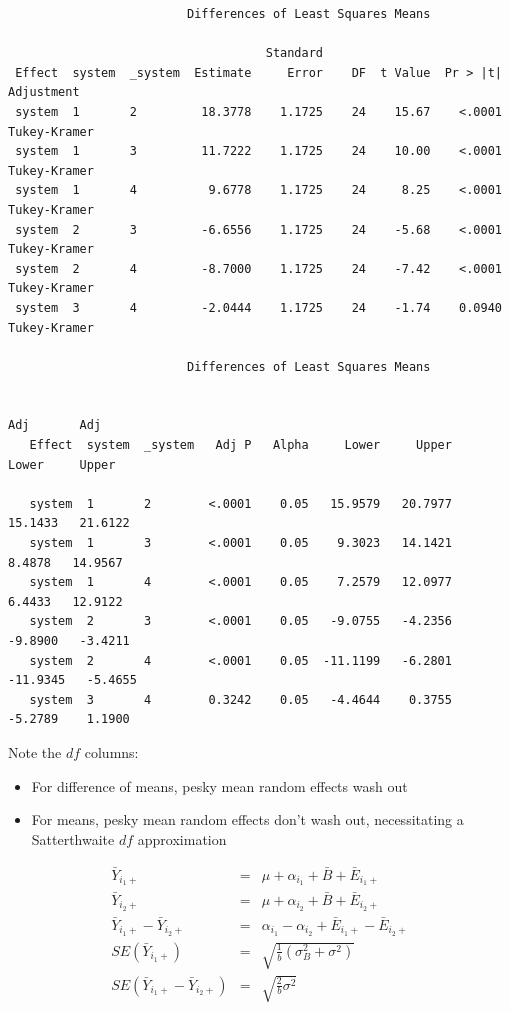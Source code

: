 \begin{large}
\begin{verbatim}
                         Differences of Least Squares Means
 
                                    Standard
 Effect  system  _system  Estimate     Error    DF  t Value  Pr > |t|  Adjustment
 system  1       2         18.3778    1.1725    24    15.67    <.0001  Tukey-Kramer
 system  1       3         11.7222    1.1725    24    10.00    <.0001  Tukey-Kramer
 system  1       4          9.6778    1.1725    24     8.25    <.0001  Tukey-Kramer
 system  2       3         -6.6556    1.1725    24    -5.68    <.0001  Tukey-Kramer
 system  2       4         -8.7000    1.1725    24    -7.42    <.0001  Tukey-Kramer
 system  3       4         -2.0444    1.1725    24    -1.74    0.0940  Tukey-Kramer

                         Differences of Least Squares Means
 
                                                                     Adj       Adj
   Effect  system  _system   Adj P   Alpha     Lower     Upper     Lower     Upper

   system  1       2        <.0001    0.05   15.9579   20.7977   15.1433   21.6122
   system  1       3        <.0001    0.05    9.3023   14.1421    8.4878   14.9567
   system  1       4        <.0001    0.05    7.2579   12.0977    6.4433   12.9122
   system  2       3        <.0001    0.05   -9.0755   -4.2356   -9.8900   -3.4211
   system  2       4        <.0001    0.05  -11.1199   -6.2801  -11.9345   -5.4655
   system  3       4        0.3242    0.05   -4.4644    0.3755   -5.2789    1.1900
\end{verbatim}
\end{large}
Note the $df$ columns:
\begin{itemize}
\item For difference of means, pesky mean random effects wash out
\item For means, pesky mean random effects don't wash out, necessitating
a Satterthwaite $df$ approximation
\end{itemize}
\begin{eqnarray*}
\bar{Y}_{i_1+} &=& \mu + \alpha_{i_1} + \bar{B} + \bar{E}_{i_1+} \\
\bar{Y}_{i_2+} &=& \mu + \alpha_{i_2} + \bar{B} + \bar{E}_{i_2+} \\
\bar{Y}_{i_1+} - \bar{Y}_{i_2+} &=& \alpha_{i_1}-\alpha_{i_2} + \bar{E}_{i_1+} - \bar{E}_{i_2+} \\
SE(\bar{Y}_{i_1+}) &=& \sqrt{\frac{1}{b}(\sigma_B^2 + \sigma^2)} \\
SE(\bar{Y}_{i_1+} - \bar{Y}_{i_2+}) &=& \sqrt{\frac{2}{b}\sigma^2}
\end{eqnarray*}

